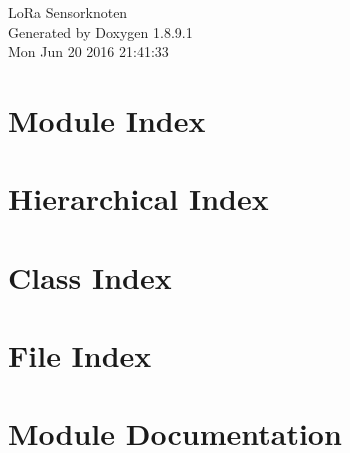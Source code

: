 \documentclass[twoside]{book}
\newcommand{\+}{\discretionary{\mbox{\scriptsize$\hookleftarrow$}}{}{}}
\newcommand{\clearemptydoublepage}{%
  \newpage{\pagestyle{empty}\cleardoublepage}%
}
\begin{document}
\hypersetup{pageanchor=false,
             bookmarks=true,
             bookmarksnumbered=true,
             pdfencoding=unicode
            }
\begin{titlepage}
\vspace*{7cm}
\begin{center}%
{\Large Lo\+Ra Sensorknoten }\\
\vspace*{1cm}
{\large Generated by Doxygen 1.8.9.1}\\
\vspace*{0.5cm}
{\small Mon Jun 20 2016 21:41:33}\\
\end{center}
\end{titlepage}
\clearemptydoublepage
\tableofcontents
\clearemptydoublepage
{}
\hypersetup{pageanchor=true}

\chapter{Module Index}

\chapter{Hierarchical Index}

\chapter{Class Index}

\chapter{File Index}

\chapter{Module Documentation}



\end{document}
